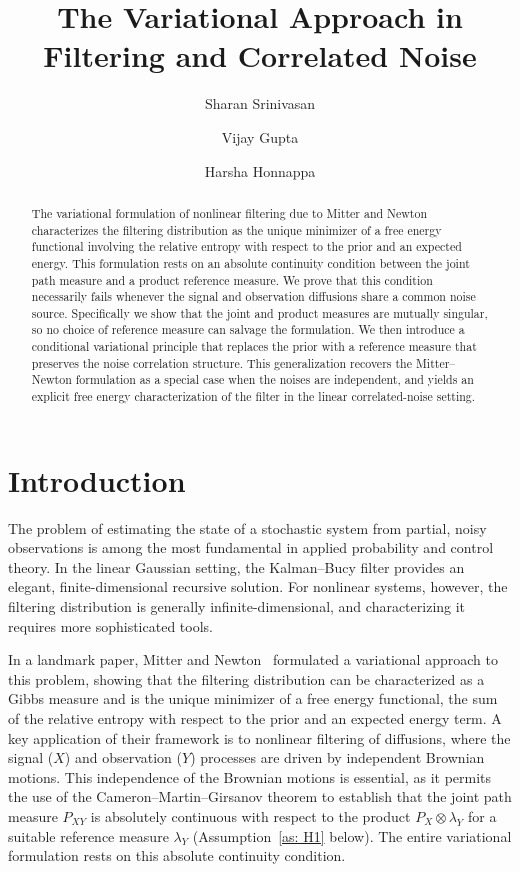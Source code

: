 \documentclass[12pt]{amsart}
\title{The Variational Approach in Filtering and Correlated Noise}
\author{Sharan Srinivasan}
\author{Vijay Gupta}
\author{Harsha Honnappa}
\theoremstyle{definition}
\theoremstyle{remark}
\begin{document}
\begin{abstract}
The variational formulation of nonlinear filtering due to Mitter and Newton characterizes the filtering distribution as the unique minimizer of a free energy functional involving the relative entropy with respect to the prior and an expected energy. This formulation rests on an absolute continuity condition between the joint path measure and a product reference measure. We prove that this condition necessarily fails whenever the signal and observation diffusions share a common noise source. Specifically we show that the joint and product measures are mutually singular, so no choice of reference measure can salvage the formulation. We then introduce a conditional variational principle that replaces the prior with a reference measure that preserves the noise correlation structure. This generalization recovers the Mitter--Newton formulation as a special case when the noises are independent, and yields an explicit free energy characterization of the filter in the linear correlated-noise setting.
\end{abstract}

\maketitle

\section{Introduction}

The problem of estimating the state of a stochastic system from partial, noisy observations is among the most fundamental in applied probability and control theory. In the linear Gaussian setting, the Kalman–Bucy filter provides an elegant, finite-dimensional recursive solution. For nonlinear systems, however, the filtering distribution is generally infinite-dimensional, and characterizing it requires more sophisticated tools.

In a landmark paper, Mitter and Newton~\cite{mitter2003variational} formulated a variational approach to this problem, showing that the filtering distribution can be characterized as a Gibbs measure and is the unique minimizer of a free energy functional, the sum of the relative entropy with respect to the prior and an expected energy term. A key application of their framework is to nonlinear filtering of diffusions, where the signal ($X$) and observation ($Y$) processes are driven by independent Brownian motions. This independence of the Brownian motions is essential, as it permits the use of the Cameron–Martin–Girsanov theorem to establish that the joint path measure $P_{XY}$ is absolutely continuous with respect to the product $P_X \otimes \lambda_Y$ for a suitable reference measure $\lambda_Y$
 (Assumption~\ref{as: H1} below). The entire variational formulation rests on this absolute continuity condition. 
 
\end{document}
